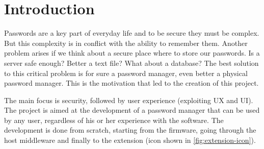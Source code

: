 \chapter{Introduction}



Passwords are a key part of everyday life and to be secure they must be complex. But this complexity is in conflict with the ability to remember them. Another problem arises if we think about a secure place where to store our passwords. Is a server safe enough? Better a text file? What about a database?
The best solution to this critical problem is for sure a password manager, even better a physical password manager. This is the motivation that led to the creation of this project.

The main focus is security, followed by user experience (exploiting UX and UI). The project is aimed at the development of a password manager that can be used by any user, regardless of his or her experience with the software. The development is done from scratch, starting from the firmware, going through the host middleware and finally to the extension (icon shown in \autoref{fig:extension-icon}).

